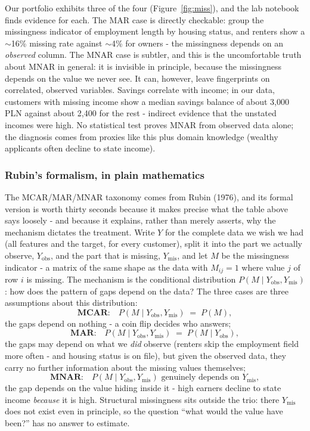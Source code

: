 \documentclass[11pt,a4paper]{article}
\begin{document}
Our portfolio exhibits three of the four (Figure~\ref{fig:miss}), and the
lab notebook finds evidence for each. The MAR case is directly checkable:
group the missingness indicator of employment length by housing status, and
renters show a $\sim$16\% missing rate against $\sim$4\% for owners - the
missingness depends on an \emph{observed} column. The MNAR case is subtler,
and this is the uncomfortable truth about MNAR in general: it is invisible
in principle, because the missingness depends on the value we never see. It
can, however, leave fingerprints on correlated, observed variables. Savings
correlate with income; in our data, customers with missing income show a
median savings balance of about 3{,}000 PLN against about 2{,}400 for the
rest - indirect evidence that the unstated incomes were high. No
statistical test proves MNAR from observed data alone; the diagnosis comes
from proxies like this plus domain knowledge (wealthy applicants often
decline to state income).

\subsubsection{Rubin's formalism, in plain mathematics}
The MCAR/MAR/MNAR taxonomy comes from Rubin (1976), and its formal version
is worth thirty seconds because it makes precise what the table above says
loosely - and because it explains, rather than merely asserts, why the
mechanism dictates the treatment. Write $Y$ for the complete data we wish
we had (all features and the target, for every customer), split it into
the part we actually observe, $Y_{\mathrm{obs}}$, and the part that is
missing, $Y_{\mathrm{mis}}$, and let $M$ be the missingness indicator -
a matrix of the same shape as the data with $M_{ij}=1$ where value $j$ of
row $i$ is missing. The mechanism is the conditional distribution
$P(M \mid Y_{\mathrm{obs}}, Y_{\mathrm{mis}})$: how does the pattern of
gaps depend on the data? The three cases are three assumptions about this
distribution:
\[
\textbf{MCAR:}\quad
P(M \mid Y_{\mathrm{obs}}, Y_{\mathrm{mis}}) \;=\; P(M),
\]
the gaps depend on nothing - a coin flip decides who answers;
\[
\textbf{MAR:}\quad
P(M \mid Y_{\mathrm{obs}}, Y_{\mathrm{mis}}) \;=\;
P(M \mid Y_{\mathrm{obs}}),
\]
the gaps may depend on what we \emph{did} observe (renters skip the
employment field more often - and housing status is on file), but given
the observed data, they carry no further information about the missing
values themselves;
\[
\textbf{MNAR:}\quad
P(M \mid Y_{\mathrm{obs}}, Y_{\mathrm{mis}})
\text{ genuinely depends on } Y_{\mathrm{mis}},
\]
the gap depends on the value hiding inside it - high earners decline to
state income \emph{because} it is high. Structural missingness sits
outside the trio: there $Y_{\mathrm{mis}}$ does not exist even in
principle, so the question ``what would the value have been?'' has no
answer to estimate.
\end{document}
